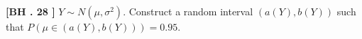 \begin{exercise}
	\textbf{[BH . 28 ]}  $Y \sim  {N}\left(\mu, \sigma^2\right)$. Construct a random interval $(a(Y), b(Y))$ such that $P(\mu\in(a(Y), b(Y)) )=0.95$.
	
\end{exercise}
